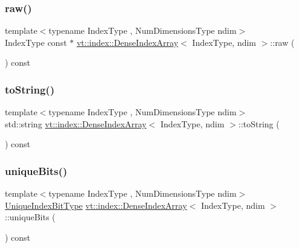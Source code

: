 \mbox{\label{structvt_1_1index_1_1_dense_index_array_a2bde995d206bb72e0f5973a78e100eea}} 
\subsubsection{\texorpdfstring{raw()}{raw()}}
{\footnotesize\ttfamily template$<$typename Index\+Type , Num\+Dimensions\+Type ndim$>$ \\
Index\+Type const  $\ast$ \hyperlink{structvt_1_1index_1_1_dense_index_array}{vt\+::index\+::\+Dense\+Index\+Array}$<$ Index\+Type, ndim $>$\+::raw (\begin{DoxyParamCaption}{ }\end{DoxyParamCaption}) const}

\mbox{\label{structvt_1_1index_1_1_dense_index_array_a102b9fa9d7a34a9a6630ab89eb9d8a7f}} 
\subsubsection{\texorpdfstring{to\+String()}{toString()}}
{\footnotesize\ttfamily template$<$typename Index\+Type , Num\+Dimensions\+Type ndim$>$ \\
std\+::string \hyperlink{structvt_1_1index_1_1_dense_index_array}{vt\+::index\+::\+Dense\+Index\+Array}$<$ Index\+Type, ndim $>$\+::to\+String (\begin{DoxyParamCaption}{ }\end{DoxyParamCaption}) const}

\mbox{\label{structvt_1_1index_1_1_dense_index_array_a41531f28f011127ee1714452dd4debef}} 
\subsubsection{\texorpdfstring{unique\+Bits()}{uniqueBits()}}
{\footnotesize\ttfamily template$<$typename Index\+Type , Num\+Dimensions\+Type ndim$>$ \\
\hyperlink{namespacevt_a913e1f07b5228dd8bb64040dc6dcea14}{Unique\+Index\+Bit\+Type} \hyperlink{structvt_1_1index_1_1_dense_index_array}{vt\+::index\+::\+Dense\+Index\+Array}$<$ Index\+Type, ndim $>$\+::unique\+Bits (\begin{DoxyParamCaption}{ }\end{DoxyParamCaption}) const}

